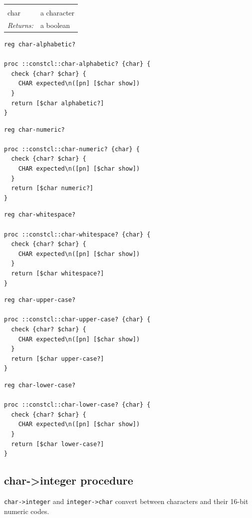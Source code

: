 \documentclass[twoside,9pt]{report}
\begin{document}
\noindent\begin{tabular}{ |p{1.9cm} p{8cm}| }
\hline
\rowcolor[HTML]{CCCCCC} \multicolumn{2}{|l|}{\bf char-upper-case?, char-lower-case? (public)} \\
char & a character \\
\textit{Returns:} & a boolean \\
\hline
\end{tabular}
\begin{lstlisting}
reg char-alphabetic?

proc ::constcl::char-alphabetic? {char} {
  check {char? $char} {
    CHAR expected\n([pn] [$char show])
  }
  return [$char alphabetic?]
}
\end{lstlisting}
\begin{lstlisting}
reg char-numeric?

proc ::constcl::char-numeric? {char} {
  check {char? $char} {
    CHAR expected\n([pn] [$char show])
  }
  return [$char numeric?]
}
\end{lstlisting}
\begin{lstlisting}
reg char-whitespace?

proc ::constcl::char-whitespace? {char} {
  check {char? $char} {
    CHAR expected\n([pn] [$char show])
  }
  return [$char whitespace?]
}
\end{lstlisting}
\begin{lstlisting}
reg char-upper-case?

proc ::constcl::char-upper-case? {char} {
  check {char? $char} {
    CHAR expected\n([pn] [$char show])
  }
  return [$char upper-case?]
}
\end{lstlisting}
\begin{lstlisting}
reg char-lower-case?

proc ::constcl::char-lower-case? {char} {
  check {char? $char} {
    CHAR expected\n([pn] [$char show])
  }
  return [$char lower-case?]
}
\end{lstlisting}
\subsection{char->integer procedure}
\label{char->integer-procedure}


\texttt{char->integer} and \texttt{integer->char} convert between characters and their 16-bit numeric codes.
\end{document}
